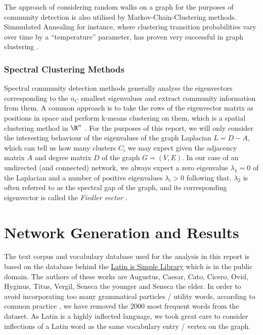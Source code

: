 \documentclass{prettytex/ox/mmsc-special-topic}
\begin{document}
  The approach of considering random walks on a graph for the purposes of community detection is also utilised by Markov-Chain-Clustering methods.
  Simmulated Annealing for instance, where clustering transition probabilities vary over time by a ``temperature'' parameter, has proven very successful in graph clustering \parencite{fortunato}.

  \subsubsection{Spectral Clustering Methods}
  \label{sec:spectral-clustering}
  Spectral community detection methods generally analyse the eigenvectors corresponding to the $n_C$ smallest eigenvalues and extract community information from them. A common approach is to take the rows of the eigenvector matrix as positions in space and perform k-means clustering on them, which is a spatial clustering method in $\R^n$ \parencite{fortunato}.
  For the purposes of this report, we will only consider the interesting behaviour of the eigenvalues of the graph Laplacian $L = D - A$, which can tell us how many clusters $C_i$ we may expect given the adjacency matrix $A$ and degree matrix $D$ of the graph $G = (V, E)$.
  In our case of an undirected (and connected) network, we always expect a zero eigenvalue $\lambda_1 = 0$ of the Laplacian and a number of positive eigenvalues $\lambda_i > 0$ following that. $\lambda_2$ is often referred to as the spectral gap of the graph, and its corresponding eigenvector is called the \textit{Fiedler vector} \parencite{grindrod-lecture-notes}.

  \pagebreak
  \section{Network Generation and Results}
  The text corpus and vocabulary database used for the analysis in this report is based on the database behind the \href{https://www.latin-is-simple.com/en/library/}{Latin is Simple Library} which is in the public domain. The authors of these works are Augustus, Caesar, Cato, Cicero, Ovid, Hyginus, Titus, Vergil, Seneca the younger and Seneca the elder.
  In order to avoid incorporating too many grammatical particles / utility words, according to common practice \parencite{cw-biemann}, we have removed the 2000 most frequent words from the dataset.
  As Latin is a highly inflected language, we took great care to consider inflections of a Latin word as the same vocabulary entry / vertex on the graph.
\end{document}
